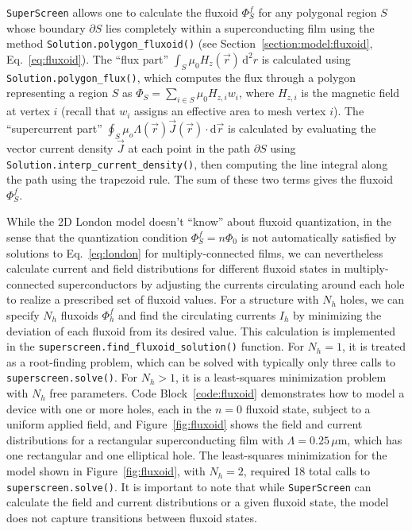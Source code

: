\documentclass[final,3p,times,twocolumn]{elsarticle}
\newcommand{\inline}[1]{\texttt{#1}\xspace}
\newcommand{\SuperScreen}{\inline{SuperScreen}}
\newcommand{\um}{\mu\mathrm{m}}
\begin{document}
\SuperScreen allows one to calculate the fluxoid $\Phi^f_S$ for any polygonal region $S$ whose boundary $\partial S$ lies completely within a superconducting film using the method \inline{Solution.polygon_fluxoid()} (see Section~\ref{section:model:fluxoid}, Eq.~\ref{eq:fluxoid}). The ``flux part''  $\int_S\mu_0H_z(\vec{r})\,\mathrm{d}^2r$ is calculated using \inline{Solution.polygon_flux()}, which computes the flux through a polygon representing a region $S$ as $\Phi_S=\sum_{i\in S} \mu_0H_{z,i}w_i$, where $H_{z,i}$ is the magnetic field at vertex $i$ (recall that $w_i$ assigns an effective area to mesh vertex $i$). The ``supercurrent part'' $\oint_S\mu_o\Lambda(\vec{r})\vec{J}(\vec{r})\cdot\mathrm{d}\vec{r}$ is calculated by evaluating the vector current density $\vec{J}$ at each point in the path $\partial S$ using \inline{Solution.interp_current_density()}, then computing the line integral along the path using the trapezoid rule. The sum of these two terms gives the fluxoid $\Phi^f_S$.

While the 2D London model doesn't ``know'' about fluxoid quantization, in the sense that the quantization condition $\Phi^f_S=n\Phi_0$ is not automatically satisfied by solutions to Eq.~\ref{eq:london} for multiply-connected films, we can nevertheless calculate current and field distributions for different fluxoid states in multiply-connected superconductors by adjusting the currents circulating around each hole to realize a prescribed set of fluxoid values. For a structure with $N_h$ holes, we can specify $N_h$ fluxoids $\Phi^f_h$ and find the circulating currents $I_h$ by minimizing the deviation of each fluxoid from its desired value. This calculation is implemented in the \inline{superscreen.find_fluxoid_solution()} function. For $N_h=1$, it is treated as a root-finding problem, which can be solved with typically only three calls to \inline{superscreen.solve()}. For $N_h>1$, it is a least-squares minimization problem with $N_h$ free parameters. Code Block~\ref{code:fluxoid} demonstrates how to model a device with one or more holes, each in the $n=0$ fluxoid state, subject to a uniform applied field, and Figure~\ref{fig:fluxoid} shows the field and current distributions for a rectangular superconducting film with $\Lambda=0.25\,\um$, which has one rectangular and one elliptical hole. The least-squares minimization for the model shown in Figure~\ref{fig:fluxoid}, with $N_h=2$, required 18 total calls to \inline{superscreen.solve()}. It is important to note that while \SuperScreen can calculate the field and current distributions or a given fluxoid state, the model does not capture transitions between fluxoid states.
\end{document}
